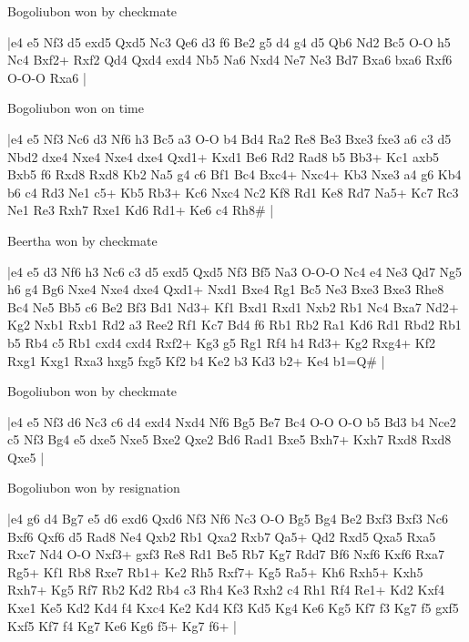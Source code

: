\showboard

Bogoliubon won by checkmate

\makegametitle
|e4 e5 Nf3 d5 exd5 Qxd5 Nc3 Qe6 d3 f6 Be2 g5 d4 g4 d5 Qb6 Nd2 Bc5 O-O h5 Nc4 Bxf2+ Rxf2 Qd4 Qxd4 exd4 Nb5 Na6 Nxd4 Ne7 Ne3 Bd7 Bxa6 bxa6 Rxf6 O-O-O Rxa6  |

\showboard

Bogoliubon won on time

\makegametitle
|e4 e5 Nf3 Nc6 d3 Nf6 h3 Bc5 a3 O-O b4 Bd4 Ra2 Re8 Be3 Bxe3 fxe3 a6 c3 d5 Nbd2 dxe4 Nxe4 Nxe4 dxe4 Qxd1+ Kxd1 Be6 Rd2 Rad8 b5 Bb3+ Kc1 axb5 Bxb5 f6 Rxd8 Rxd8 Kb2 Na5 g4 c6 Bf1 Bc4 Bxc4+ Nxc4+ Kb3 Nxe3 a4 g6 Kb4 b6 c4 Rd3 Ne1 c5+ Kb5 Rb3+ Kc6 Nxc4 Nc2 Kf8 Rd1 Ke8 Rd7 Na5+ Kc7 Rc3 Ne1 Re3 Rxh7 Rxe1 Kd6 Rd1+ Ke6 c4 Rh8\#  |

\showboard

Beertha won by checkmate

\makegametitle
|e4 e5 d3 Nf6 h3 Nc6 c3 d5 exd5 Qxd5 Nf3 Bf5 Na3 O-O-O Nc4 e4 Ne3 Qd7 Ng5 h6 g4 Bg6 Nxe4 Nxe4 dxe4 Qxd1+ Nxd1 Bxe4 Rg1 Bc5 Ne3 Bxe3 Bxe3 Rhe8 Bc4 Ne5 Bb5 c6 Be2 Bf3 Bd1 Nd3+ Kf1 Bxd1 Rxd1 Nxb2 Rb1 Nc4 Bxa7 Nd2+ Kg2 Nxb1 Rxb1 Rd2 a3 Ree2 Rf1 Kc7 Bd4 f6 Rb1 Rb2 Ra1 Kd6 Rd1 Rbd2 Rb1 b5 Rb4 c5 Rb1 cxd4 cxd4 Rxf2+ Kg3 g5 Rg1 Rf4 h4 Rd3+ Kg2 Rxg4+ Kf2 Rxg1 Kxg1 Rxa3 hxg5 fxg5 Kf2 b4 Ke2 b3 Kd3 b2+ Ke4 b1=Q\#  |

\showboard

Bogoliubon won by checkmate

\makegametitle
|e4 e5 Nf3 d6 Nc3 c6 d4 exd4 Nxd4 Nf6 Bg5 Be7 Bc4 O-O O-O b5 Bd3 b4 Nce2 c5 Nf3 Bg4 e5 dxe5 Nxe5 Bxe2 Qxe2 Bd6 Rad1 Bxe5 Bxh7+ Kxh7 Rxd8 Rxd8 Qxe5  |

\showboard

Bogoliubon won by resignation

\makegametitle
|e4 g6 d4 Bg7 e5 d6 exd6 Qxd6 Nf3 Nf6 Nc3 O-O Bg5 Bg4 Be2 Bxf3 Bxf3 Nc6 Bxf6 Qxf6 d5 Rad8 Ne4 Qxb2 Rb1 Qxa2 Rxb7 Qa5+ Qd2 Rxd5 Qxa5 Rxa5 Rxc7 Nd4 O-O Nxf3+ gxf3 Re8 Rd1 Be5 Rb7 Kg7 Rdd7 Bf6 Nxf6 Kxf6 Rxa7 Rg5+ Kf1 Rb8 Rxe7 Rb1+ Ke2 Rh5 Rxf7+ Kg5 Ra5+ Kh6 Rxh5+ Kxh5 Rxh7+ Kg5 Rf7 Rb2 Kd2 Rb4 c3 Rh4 Ke3 Rxh2 c4 Rh1 Rf4 Re1+ Kd2 Kxf4 Kxe1 Ke5 Kd2 Kd4 f4 Kxc4 Ke2 Kd4 Kf3 Kd5 Kg4 Ke6 Kg5 Kf7 f3 Kg7 f5 gxf5 Kxf5 Kf7 f4 Kg7 Ke6 Kg6 f5+ Kg7 f6+  |

